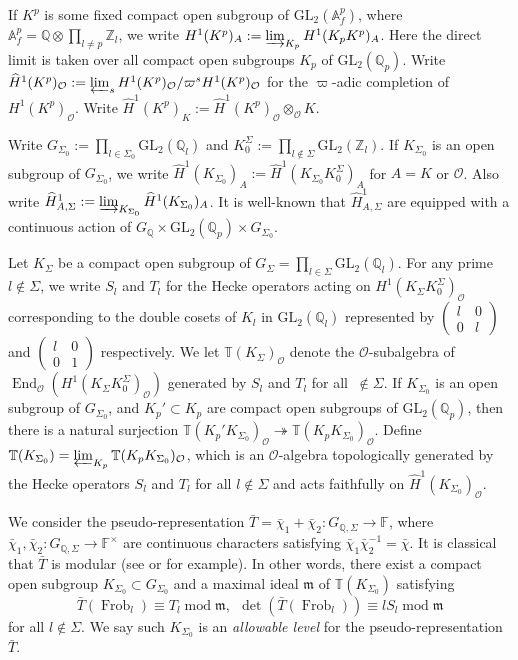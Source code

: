 \documentclass[a4paper, 12pt]{amsart}
\DeclareMathOperator{\End}{End}
\DeclareMathOperator{\modd}{mod}
\DeclareMathOperator{\Frob}{Frob}
\newcommand{\Z}{\mathbb{Z}}
\newcommand{\F}{\mathbb{F}}
\newcommand{\Q}{\mathbb{Q}}
\newcommand{\T}{\mathbb{T}}
\newcommand{\A}{\mathbb{A}}
\newcommand{\GL}{\mathrm{GL}}
\newcommand{\cO}{\mathcal{O}}
\newcommand{\km}{\mathfrak{m}}
\begin{document}
    If $K^p$ is some fixed compact open subgroup of $\GL_2(\A_f^p)$, where $ \A_f^p = \Q \otimes \prod_{l \ne p} \Z_l$, we write $H^1(K^p)_A := \varinjlim_{K_p} H^1(K_pK^p)_A$. Here the direct limit is taken over all compact open subgroups $K_p$ of $\GL_2(\Q_p)$. Write $\widehat{H}^1(K^p)_\cO := \varprojlim_s H^1(K^p)_\cO/\varpi^sH^1(K^p)_\cO$ for the $\varpi$-adic completion of $H^1(K^p)_\cO $. Write $ \widehat{H}^1(K^p)_K := \widehat{H}^1(K^p)_\cO \otimes_\cO K$.
    
    Write $G_{\Sigma_0} := \prod_{l \in \Sigma_0} \GL_2(\Q_l)$ and $K_0^\Sigma := \prod_{l \notin \Sigma} \GL_2(\Z_l)$. If $K_{\Sigma_0}$ is an open subgroup of $G_{\Sigma_0}$, we write $\widehat{H}^1(K_{\Sigma_0})_A := \widehat{H}^1(K_{\Sigma_0}K_0^\Sigma)_A$ for $A=K$ or $\cO$. Also write $\widehat{H}^1_{A, \Sigma}:= \varinjlim_{K_{\Sigma_0}} \widehat{H}^1(K_{\Sigma_0})_A$. It is well-known that $\widehat{H}^1_{A, \Sigma} $ are equipped with a continuous action of $G_\Q \times \GL_2(\Q_p)\times G_{\Sigma_0}$.
    
    Let $K_\Sigma$ be a compact open subgroup of $G_\Sigma = \prod_{l \in \Sigma} \GL_2(\Q_l)$. For any prime $l \notin \Sigma$, we write $S_l$ and $T_l$ for the Hecke operators acting on $H^1(K_\Sigma K_0^\Sigma)_\cO$ corresponding to the double cosets of $K_l$ in $\GL_2(\Q_l)$ represented by $\begin{pmatrix}
    	l & 0\\
    	0& l
    \end{pmatrix} $ and $\begin{pmatrix}
    l & 0\\
    0& 1
    \end{pmatrix} $ respectively. We let $\T(K_\Sigma)_\cO$ denote the $\cO$-subalgebra of $\End_\cO(H^1(K_\Sigma K_0^\Sigma)_\cO)$ generated by $S_l$ and $T_l$ for all $\ \notin \Sigma$. If $K_{\Sigma_0}$ is an open subgroup of $G_{\Sigma_0}$, and $K_p' \subset K_p  $ are compact open subgroups of $\GL_2(\Q_p) $, then there is a natural surjection $\T(K_p'K_{\Sigma_0})_\cO \twoheadrightarrow \T(K_pK_{\Sigma_0})_\cO$. Define $\T(K_{\Sigma_0}) = \varprojlim_{K_p}\T(K_pK_{\Sigma_0})_\cO$, which is an $\cO$-algebra topologically generated by the Hecke operators $S_l$ and $T_l$ for all $l \notin \Sigma$ and acts faithfully on $ \widehat{H}^1(K_{\Sigma_0})_\cO$.
    
    We consider the pseudo-representation $\bar{T} = \bar{\chi}_1 + \bar{\chi}_2 : G_{\Q, \Sigma} \to \F$, where $\bar{\chi}_1, \bar{\chi}_2 : G_{\Q, \Sigma} \to \F^\times$ are continuous characters satisfying $\bar{\chi}_1\bar{\chi}_2^{-1}=\bar{\chi}$. It is classical that $\bar{T}$ is modular (see \cite[Lemma 2.23]{Deo2023} or \cite[Lemma 7.3]{Fakhruddin2022} for example). In other words, there exist a compact open subgroup $K_{\Sigma_0} \subset G_{\Sigma_0}$ and a maximal ideal $\km$ of $\T(K_{\Sigma_0})$ satisfying
    $$ \bar{T}(\Frob_l) \equiv T_l \modd \km,  ~~\det(\bar{T}(\Frob_l)) \equiv lS_l \modd \km$$
    for all $l \notin \Sigma$. We say such $K_{\Sigma_0}$ is an \textit{allowable level} for the pseudo-representation $\bar{T}$.
    
\end{document}
